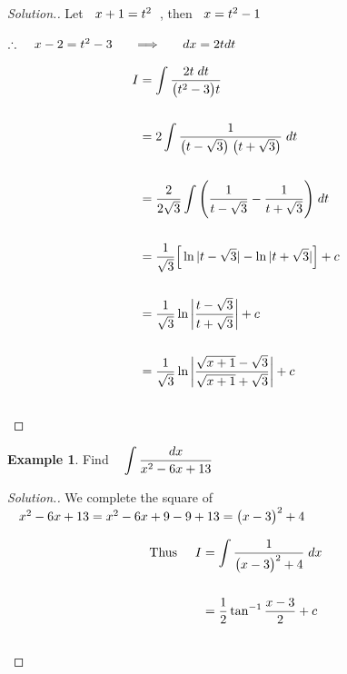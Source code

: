 \documentclass[11pt,a4paper]{article}
\theoremstyle{definition}
\newtheorem{exa}[thm]{Example}
\newenvironment{solution}
  {\renewcommand{\qedsymbol}{}\begin{proof}[\textit{Solution}.]}
  {\end{proof}}
\begin{document}
\begin{solution}


Let $\hspace{0.2cm} x + 1 = t^2\hspace{0.2cm}$, then $\hspace{0.2cm} x = t^2 - 1$


$\therefore\hspace{0.4cm} x - 2 = t^2 - 3\hspace{0.5cm} \implies \hspace{0.5cm} dx = 2tdt$

\begin{align*}
I & = \int \dfrac{2t\hspace{0.1cm}dt}{\big(t^2 - 3\big) t}\\\\
& = 2\int \dfrac{1}{\big(t - \sqrt{3}\big)\hspace{0.1cm} \big(t + \sqrt{3}\big)}\hspace{0.1cm}dt\\\\
& = \dfrac{2}{2\sqrt{3}}\int \Bigg(\dfrac{1}{t - \sqrt{3}} - \dfrac{1}{t + \sqrt{3}}\Bigg)\hspace{0.1cm}dt\\\\
& = \frac{1}{\sqrt{3}}\Big[\ln |t - \sqrt{3}| - \ln |t + \sqrt{3}|\Big] + c\\\\
& = \dfrac{1}{\sqrt{3}}\ln\left|\dfrac{t - \sqrt{3}}{t + \sqrt{3}}\right| + c\\\\
& = \dfrac{1}{\sqrt{3}} \ln\left|\dfrac{\sqrt{x + 1} - \sqrt{3}}{\sqrt{x + 1} + \sqrt{3}}\right| + c\\\\
\end{align*}
\end{solution}

\begin{exa}


Find $\hspace{0.3cm} \displaystyle{\int \dfrac{dx}{x^2 - 6x + 13}}$
\end{exa}


\begin{solution}


We complete the square of $\hspace{0.3cm} x^2 - 6x + 13 = x^2 - 6x + 9 - 9 + 13 = \big(x - 3\big)^2 + 4$

\begin{align*}
\text{Thus}\hspace{0.5cm} I & = \int \dfrac{1}{\big(x - 3\big)^2  + 4}\hspace{0.1cm}dx\\\\
& = \dfrac{1}{2}\tan^{-1}\dfrac{x - 3}{2} + c\\\\
\end{align*}
\end{solution}
\end{document}
